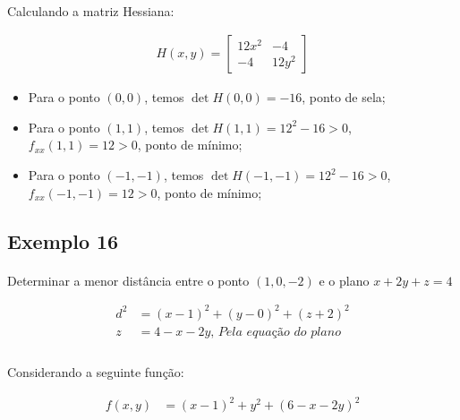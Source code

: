 \documentclass{article}
\begin{document}
            \paragraph{}
            Calculando a matriz Hessiana:

            \begin{align*}
                H(x, y) =
                \left[
                    \begin{matrix}
                        12x^2 & -4\\
                        -4 & 12y^2
                    \end{matrix}
                \right]
            \end{align*}

            \begin{itemize}
                \item Para o ponto $(0,0)$, temos $\det H(0, 0) = -16$, ponto de sela;
                \item Para o ponto $(1,1)$, temos $\det H(1, 1) = 12^2 - 16 > 0$, $f_{xx}(1, 1) = 12 > 0$, ponto de mínimo;
                \item Para o ponto $(-1,-1)$, temos $\det H(-1, -1) = 12^2 - 16 > 0$, $f_{xx}(-1, -1) = 12 > 0$, ponto de mínimo;
            \end{itemize}
        
        \subsection{Exemplo 16}
            \paragraph{}
            Determinar a menor distância entre o ponto $(1, 0, -2)$ e o plano $x + 2y + z = 4$

            \begin{align*}
                d^2 &= (x - 1)^2 + (y - 0)^2 + (z + 2)^2\\
                z &= 4 - x - 2y \textit{, Pela equação do plano}\\
            \end{align*}

            \paragraph{}
            Considerando a seguinte função:

            \begin{align*}
                f(x, y) &= (x - 1)^2 + y^2 + (6 -x -2y)^2\\
            \end{align*}
\end{document}

